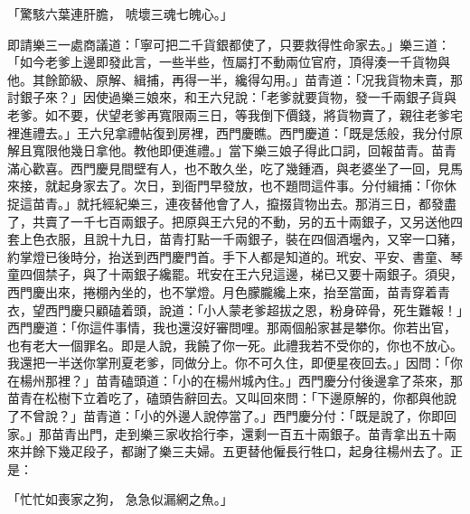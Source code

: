 「驚駭六葉連肝膽，  唬壞三魂七魄心。」

即請樂三一處商議道：「寧可把二千貨銀都使了，只要救得性命家去。」樂三道：「如今老爹上邊即發此言，一些半些，恆屬打不動兩位官府，頂得湊一千貨物與他。其餘節級、原解、緝捕，再得一半，纔得勾用。」苗青道：「况我貨物未賣，那討銀子來？」因使過樂三娘來，和王六兒說：「老爹就要貨物，發一千兩銀子貨與老爹。如不要，伏望老爹再寬限兩三日，等我倒下價錢，將貨物賣了，親往老爹宅裡進禮去。」王六兒拿禮帖復到房裡，西門慶瞧。西門慶道：「既是恁般，我分付原解且寬限他幾日拿他。教他即便進禮。」當下樂三娘子得此口詞，回報苗青。苗青滿心歡喜。西門慶見間壁有人，也不敢久坐，吃了幾鍾酒，與老婆坐了一回，見馬來接，就起身家去了。次日，到衙門早發放，也不題問這件事。分付緝捕：「你休捉這苗青。」就托經紀樂三，連夜替他會了人，攛掇貨物出去。那消三日，都發盡了，共賣了一千七百兩銀子。把原與王六兒的不動，另的五十兩銀子，又另送他四套上色衣服，且說十九日，苗青打點一千兩銀子，裝在四個酒壜內，又宰一口豬，約掌燈已後時分，抬送到西門慶門首。手下人都是知道的。玳安、平安、書童、琴童四個禁子，與了十兩銀子纔罷。玳安在王六兒這邊，梯已又要十兩銀子。須臾，西門慶出來，捲棚內坐的，也不掌燈。月色朦朧纔上來，抬至當面，苗青穿着青衣，望西門慶只顧磕着頭，說道：「小人蒙老爹超拔之恩，粉身碎骨，死生難報！」西門慶道：「你這件事情，我也還沒好審問哩。那兩個船家甚是攀你。你若出官，也有老大一個罪名。即是人說，我饒了你一死。此禮我若不受你的，你也不放心。我還把一半送你掌刑夏老爹，同做分上。你不可久住，即便星夜回去。」因問：「你在楊州那裡？」苗青磕頭道：「小的在楊州城內住。」西門慶分付後邊拿了茶來，那苗青在松樹下立着吃了，磕頭告辭回去。又叫回來問：「下邊原解的，你都與他說了不曾說？」苗青道：「小的外邊人說停當了。」西門慶分付：「既是說了，你即回家。」那苗青出門，走到樂三家收拾行李，還剩一百五十兩銀子。苗青拿出五十兩來并餘下幾疋段子，都謝了樂三夫婦。五更替他僱長行牲口，起身往楊州去了。正是：

「忙忙如喪家之狗，  急急似漏網之魚。」

